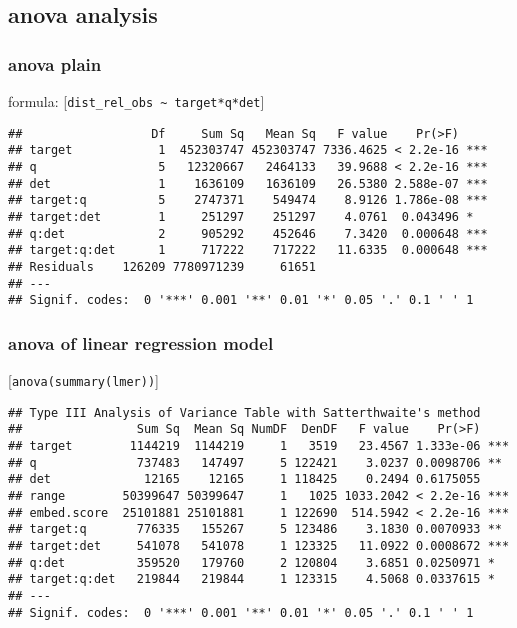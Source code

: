 \documentclass[
  12pt,
  oneside]{book}
\begin{document}
\subsection{anova analysis}\label{anova-analysis}

\subsubsection{anova plain}\label{anova-plain}

formula: {[}\texttt{dist\_rel\_obs\ \textasciitilde{}\ target*q*det}{]}

\begin{verbatim}
##                  Df     Sum Sq   Mean Sq   F value    Pr(>F)    
## target            1  452303747 452303747 7336.4625 < 2.2e-16 ***
## q                 5   12320667   2464133   39.9688 < 2.2e-16 ***
## det               1    1636109   1636109   26.5380 2.588e-07 ***
## target:q          5    2747371    549474    8.9126 1.786e-08 ***
## target:det        1     251297    251297    4.0761  0.043496 *  
## q:det             2     905292    452646    7.3420  0.000648 ***
## target:q:det      1     717222    717222   11.6335  0.000648 ***
## Residuals    126209 7780971239     61651                        
## ---
## Signif. codes:  0 '***' 0.001 '**' 0.01 '*' 0.05 '.' 0.1 ' ' 1
\end{verbatim}

\subsubsection{anova of linear regression model}\label{anova-of-linear-regression-model}

{[}\texttt{anova(summary(lmer))}{]}

\begin{verbatim}
## Type III Analysis of Variance Table with Satterthwaite's method
##                Sum Sq  Mean Sq NumDF  DenDF   F value    Pr(>F)    
## target        1144219  1144219     1   3519   23.4567 1.333e-06 ***
## q              737483   147497     5 122421    3.0237 0.0098706 ** 
## det             12165    12165     1 118425    0.2494 0.6175055    
## range        50399647 50399647     1   1025 1033.2042 < 2.2e-16 ***
## embed.score  25101881 25101881     1 122690  514.5942 < 2.2e-16 ***
## target:q       776335   155267     5 123486    3.1830 0.0070933 ** 
## target:det     541078   541078     1 123325   11.0922 0.0008672 ***
## q:det          359520   179760     2 120804    3.6851 0.0250971 *  
## target:q:det   219844   219844     1 123315    4.5068 0.0337615 *  
## ---
## Signif. codes:  0 '***' 0.001 '**' 0.01 '*' 0.05 '.' 0.1 ' ' 1
\end{verbatim}
\end{document}
